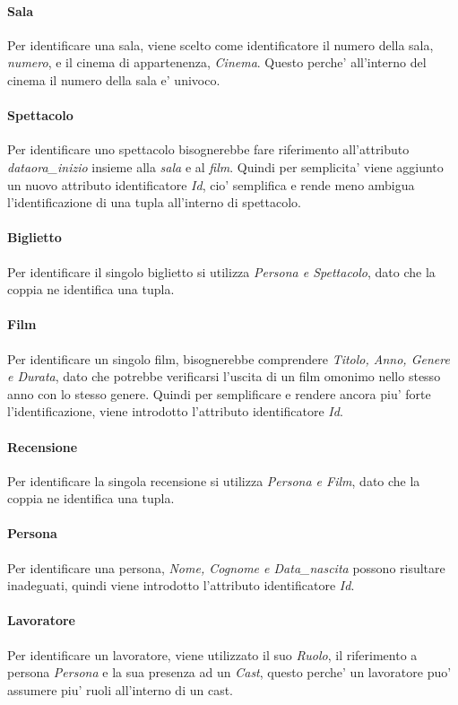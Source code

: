 \documentclass[10pt]{article}
\begin{document}
	\paragraph{Sala}
	Per identificare una sala, viene scelto come identificatore il numero della sala, \textit{numero}, e il cinema di appartenenza, \textit{Cinema}. Questo perche' all'interno del cinema il numero della sala e' univoco.
	\paragraph{Spettacolo}
	Per identificare uno spettacolo bisognerebbe fare riferimento all'attributo \textit{dataora\_inizio} insieme alla \textit{sala} e al \textit{film}. Quindi per semplicita' viene aggiunto un nuovo attributo identificatore \textit{Id}, cio' semplifica e rende meno ambigua l'identificazione di una tupla all'interno di spettacolo.
	\paragraph{Biglietto}
	Per identificare il singolo biglietto si utilizza \textit{Persona e Spettacolo}, dato che la coppia ne identifica una tupla.
	\paragraph{Film}
	Per identificare un singolo film, bisognerebbe comprendere \textit{Titolo, Anno, Genere e Durata}, dato che potrebbe verificarsi l'uscita di un film omonimo nello stesso anno con lo stesso genere. Quindi per semplificare e rendere ancora piu' forte l'identificazione, viene introdotto l'attributo identificatore \textit{Id}.
	\paragraph{Recensione}
	Per identificare la singola recensione si utilizza \textit{Persona e Film}, dato che la coppia ne identifica una tupla.
	\paragraph{Persona}
	Per identificare una persona, \textit{Nome, Cognome e Data\_nascita} possono risultare inadeguati, quindi viene introdotto l'attributo identificatore \textit{Id}.
	\paragraph{Lavoratore}
	Per identificare un lavoratore, viene utilizzato il suo \textit{Ruolo}, il riferimento a persona \textit{Persona} e la sua presenza ad un \textit{Cast}, questo perche' un lavoratore puo' assumere piu' ruoli all'interno di un cast.
\end{document}
